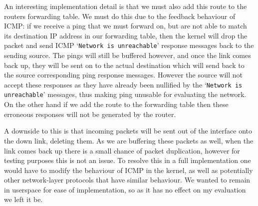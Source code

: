 \documentclass[withindex,glossary,openany]{cam-thesis}
\begin{document}
An interesting implementation detail is that we must also add this route to the routers forwarding table. We must do this due to the feedback behaviour of ICMP: if we receive a ping that we must forward on, but are not able to match its destination IP address in our forwarding table, then the kernel will drop the packet and send ICMP `\texttt{Network is unreachable}' response messages back to the sending source. The pings will still be buffered however, and once the link comes back up, they will be sent on to the actual destination which will send back to the source corresponding ping response messages. However the source will not accept these responses as they have already been nullified by the `\texttt{Network is unreachable}' messages, thus making ping unusable for evaluating the network. On the other hand if we add the route to the forwarding table then these erroneous responses will not be generated by the router.

A downside to this is that incoming packets will be sent out of the interface onto the down link, deleting them. As we are buffering these packets as well, when the link comes back up there is a small chance of packet duplication, however for testing purposes this is not an issue. To resolve this in a full implementation one would have to modify the behaviour of ICMP in the kernel, as well as potentially other network-layer protocols that have similar behaviour. We wanted to remain in userspace for ease of implementation, so as it has no effect on my evaluation we left it be.


\end{document}
